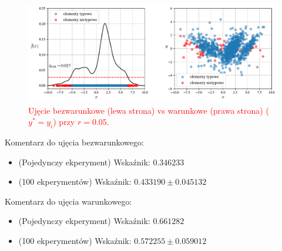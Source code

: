 \documentclass[12pt,a4paper,oneside]{book}
\theoremstyle{definition}
\begin{document}
\begin{figure}[H]
    \centering
    \includegraphics[scale=0.6]{synthetic_data_outliers_kde_and_ckde}
    \vspace{-0.5cm} 
    \caption{\textcolor{red}{Ujęcie bezwarunkowe (lewa strona) vs warunkowe (prawa strona) ($y^*=y_i$) przy $r=0.05$.}}
\end{figure}
Komentarz do ujęcia bezwarunkowego:
\begin{itemize}
\item (Pojedynczy ekperyment) Wskaźnik: $0.346233$
\item (100 ekperymentów) Wskaźnik: $0.433190 \pm 0.045132$
\end{itemize}
Komentarz do ujęcia warunkowego:
\begin{itemize}
\item (Pojedynczy ekperyment) Wskaźnik: $0.661282$
\item (100 ekperymentów) Wskaźnik: $0.572255 \pm 0.059012$
\end{itemize}

\newpage
\end{document}
